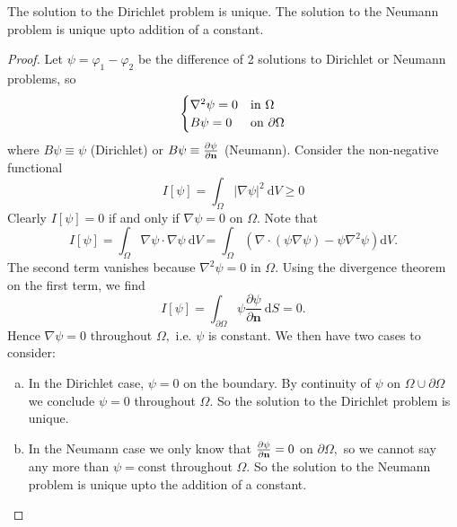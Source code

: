 \begin{proposition}
    The solution to the Dirichlet problem is unique. The solution to the Neumann problem is unique upto addition of a constant.
\end{proposition}
\begin{proof}
    Let $ \psi=\varphi_1-\varphi_2 $ be the difference of 2 solutions to Dirichlet or Neumann problems, so 
    \[
    \begin{cases}
        \laplacian \psi=0 & \text {in } \Omega \\
        B \psi=0 & \text {on } \partial \Omega
    \end{cases} 
    \]
    where $B \psi \equiv \psi$ (Dirichlet) or $B \psi \equiv \frac{\partial \psi}{\partial {\bf n}}$ (Neumann). Consider the non-negative functional
    \[
        I[\psi]=\int_{\Omega}|\nabla \psi|^{2} \mathrm{~d} V \ge 0
    \]
    Clearly $I[\psi]=0$ if and only if $\nabla \psi=0$ on $\Omega$. Note that
    \[
        I[\psi]=\int_{\Omega} \nabla \psi \cdot \nabla \psi \mathrm{~d} V=\int_{\Omega}\left(\nabla \cdot(\psi \nabla \psi)-\psi \nabla^{2} \psi\right) \mathrm{d} V.
    \]
    The second term vanishes because $\nabla^{2} \psi=0$ in $\Omega$. Using the divergence theorem on the first term, we find
    \[
        I[\psi]=\int_{\partial \Omega} \psi \frac{\partial \psi}{\partial \mathbf{n}} \mathrm{~d} S=0.
    \]
    Hence $\nabla \psi=0$ throughout $\Omega,$ i.e. $\psi$ is constant. We then have two cases to consider:
    \begin{enumerate}[(a)]
        \item In the Dirichlet case, $\psi=0$ on the boundary. By continuity of $\psi$ on $\Omega \cup \partial \Omega$ we conclude $\psi=0$ throughout $\Omega$. So the solution to the Dirichlet problem is unique.
        \item In the Neumann case we only know that $\frac{\partial \psi}{\partial {\bf n}}=0$ on $\partial \Omega,$ so we cannot say any more than $\psi=\text{const}$ throughout $\Omega$. So the solution to the Neumann problem is unique upto the addition of a constant.\qedhere
    \end{enumerate}
\end{proof}

